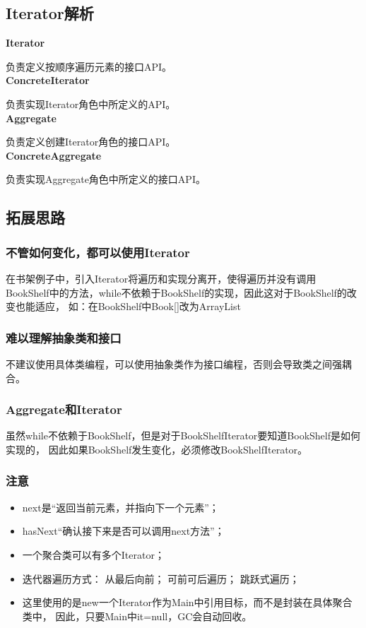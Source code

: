 \subsection{Iterator解析}
\noindent \textbf{Iterator}
\par 负责定义按顺序遍历元素的接口API。
\\ \textbf{ConcreteIterator}
\par 负责实现Iterator角色中所定义的API。
\\ \textbf{Aggregate}
\par 负责定义创建Iterator角色的接口API。
\\ \textbf{ConcreteAggregate}
\par 负责实现Aggregate角色中所定义的接口API。
\subsection{拓展思路}
\subsubsection{不管如何变化，都可以使用Iterator}
在书架例子中，引入Iterator将遍历和实现分离开，使得遍历并没有调用
BookShelf中的方法，while不依赖于BookShelf的实现，因此这对于BookShelf的改变也能适应，
如：在BookShelf中Book[]改为ArrayList
\subsubsection{难以理解抽象类和接口}
不建议使用具体类编程，可以使用抽象类作为接口编程，否则会导致类之间强耦合。
\subsubsection{Aggregate和Iterator}
虽然while不依赖于BookShelf，但是对于BookShelfIterator要知道BookShelf是如何实现的，
因此如果BookShelf发生变化，必须修改BookShelfIterator。
\subsubsection{注意}
\begin{itemize}
	\item next是“返回当前元素，并指向下一个元素”；
	\item hasNext“确认接下来是否可以调用next方法”；
	\item 一个聚合类可以有多个Iterator；
	\item 迭代器遍历方式：
	\subitem 从最后向前；
	\subitem 可前可后遍历；
	\subitem 跳跃式遍历；
	\item 这里使用的是new一个Iterator作为Main中引用目标，而不是封装在具体聚合类中，
	因此，只要Main中it=null，GC会自动回收。
\end{itemize}
